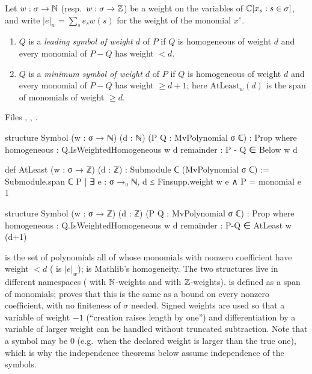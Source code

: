 \begin{definition}\label{l11:def:symbol}
Let $w:\sigma\to{\mathbb{N}}$ (resp.\ $w:\sigma\to{\mathbb{Z}}$) be a weight on the variables of ${\mathbb{C}}[x_s : s\in\sigma]$, and write
$|e|_w = \sum_se_sw(s)$ for the weight of the monomial $x^e$.
\begin{enumerate}
\item $Q$ is a \emph{leading symbol of weight $d$} of $P$ if $Q$ is homogeneous of weight $d$ and every monomial
  of $P-Q$ has weight $<d$.
\item $Q$ is a \emph{minimum symbol of weight $d$} of $P$ if $Q$ is homogeneous of weight $d$ and every monomial
  of $P-Q$ has weight $\ge d+1$; here $\mathrm{AtLeast}_w(d)$ is the span of monomials of weight $\ge d$.
\end{enumerate}
\end{definition}
\noindent Files ,
,
.
\begin{leancode}
structure Symbol (w : σ → ℕ) (d : ℕ) (P Q : MvPolynomial σ ℂ) : Prop where
  homogeneous : Q.IsWeightedHomogeneous w d
  remainder : P - Q ∈ Below w d

def AtLeast (w : σ → ℤ) (d : ℤ) : Submodule ℂ (MvPolynomial σ ℂ) :=
  Submodule.span ℂ {P | ∃ e : σ →₀ ℕ, d ≤ Finsupp.weight w e ∧ P = monomial e 1}

structure Symbol (w : σ → ℤ) (d : ℤ) (P Q : MvPolynomial σ ℂ) : Prop where
  homogeneous : Q.IsWeightedHomogeneous w d
  remainder : P-Q ∈ AtLeast w (d+1)
\end{leancode}

\begin{dictionary}
 is the set of polynomials all of whose monomials with nonzero coefficient have weight $<d$
( is $|e|_w$);  is Mathlib's homogeneity. The two 
structures live in different namespaces ( with ${\mathbb{N}}$-weights and
 with ${\mathbb{Z}}$-weights).  is defined as a span of monomials;
 proves that this is the same as a bound on every nonzero coefficient, with no finiteness of
$\sigma$ needed. Signed weights are used so that a variable of weight $-1$ (``creation raises length by one'')
and differentiation by a variable of larger weight can be handled without truncated subtraction. Note that a
symbol may be $0$ (e.g.\ when the declared weight is larger than the true one), which is why the independence
theorems below assume independence of the symbols.
\end{dictionary}

